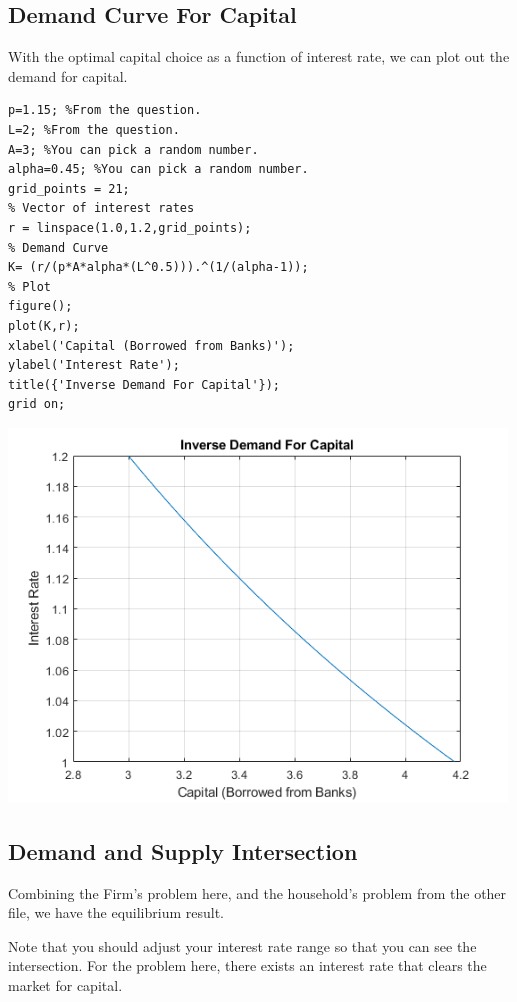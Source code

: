 \documentclass[
]{book}
\begin{document}
\hypertarget{demand-curve-for-capital}{%
\subsection{Demand Curve For Capital}\label{demand-curve-for-capital}}

With the optimal capital choice as a function of interest rate, we can
plot out the demand for capital.

\begin{verbatim}
p=1.15; %From the question.
L=2; %From the question.
A=3; %You can pick a random number.
alpha=0.45; %You can pick a random number.
grid_points = 21;
% Vector of interest rates
r = linspace(1.0,1.2,grid_points);
% Demand Curve
K= (r/(p*A*alpha*(L^0.5))).^(1/(alpha-1));
% Plot
figure();
plot(K,r);
xlabel('Capital (Borrowed from Banks)');
ylabel('Interest Rate');
title({'Inverse Demand For Capital'});
grid on;
\end{verbatim}

\includegraphics[width=5.20833in,height=\textheight]{img/K_borrow_firm_images/figure_1.png}

\hypertarget{demand-and-supply-intersection}{%
\subsection{Demand and Supply Intersection}\label{demand-and-supply-intersection}}

Combining the Firm's problem here, and the household's problem from the
other file, we have the equilibrium result.

Note that you should adjust your interest rate range so that you can see
the intersection. For the problem here, there exists an interest rate
that clears the market for capital.
\end{document}
